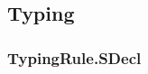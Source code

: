 \begin{mathpar}
\end{mathpar}

\subsection{Typing}
\subsubsection{TypingRule.SDecl\label{sec:TypingRule.SDecl}}
